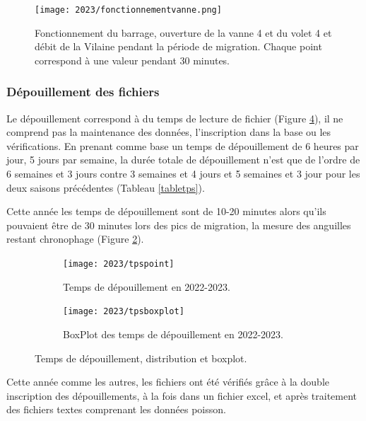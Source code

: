 \documentclass[11pt,twocolumn,titlepage,twoside]{article}
\begin{document}
\begin{figure}[ht!]
  \centering
  \texttt{[image: 2023/fonctionnementvanne.png]}
  \caption[Fonctionnement du barrage]{Fonctionnement du barrage, ouverture de la
  vanne 4 et du volet 4 et débit de la Vilaine pendant la période de migration.
  Chaque point correspond à une valeur pendant 30 minutes. 
  }
  \label{fonctionnementvanne}
\end{figure}



\subsubsection{Dépouillement des fichiers}
Le dépouillement correspond à du temps de lecture de fichier (Figure
\ref{tps}), il ne comprend pas la maintenance des
données, l'inscription dans la base ou les vérifications. 
En prenant comme base un temps de dépouillement de 6 heures par jour, 5
jours par semaine, la durée totale de dépouillement n'est que de l'ordre de
\num{6} semaines et
\num{3} jours contre 
\num{3} semaines et
\num{4} jours et 
\num{5} semaines et
\num{3} jour pour les deux
saisons précédentes (Tableau \ref{tabletps}). 



Cette année les temps de dépouillement sont de 10-20 minutes alors qu'ils
pouvaient être de 30 minutes lors des pics de migration, la mesure des anguilles
restant chronophage (Figure \ref{tpspoint}).
\begin{figure}[htbp]
        \centering
        \begin{subfigure}{0.4\textwidth}
                \centering
                \texttt{[image: 2023/tpspoint]}
                \caption[Temps de dépouillement par fichier de 30
                minutes]{Temps de dépouillement en 2022-2023.}
                \label{tpspoint}
       \end{subfigure}%
       \quad
      \begin{subfigure}{0.4\textwidth}
                \centering
                \texttt{[image: 2023/tpsboxplot]}
                \caption[Temps de dépouillement par fichier de 30
                minutes]{BoxPlot des temps de dépouillement en 2022-2023.}
                \label{tpsboxplot}
        \end{subfigure}%
        \caption[Temps de dépouillement, distribution et boxplot]{Temps de
        dépouillement, distribution et boxplot.}
              \label{tps}
\end{figure}
Cette année comme les autres, les fichiers ont été vérifiés grâce à la double
inscription des dépouillements, à la fois dans un fichier excel, et après
traitement des fichiers textes comprenant les données poisson.
\end{document}
